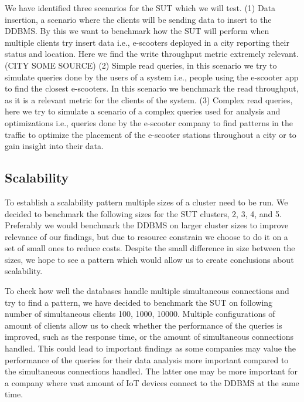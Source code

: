 We have identified three scenarios for the SUT which we will test.
(1) Data insertion, a scenario where the clients will be sending data to insert to the DDBMS.
By this we want to benchmark how the SUT will perform when multiple clients try insert data i.e., e-scooters deployed in a city reporting their status and location.
Here we find the write throughput metric extremely relevant. (CITY SOME SOURCE)
(2) Simple read queries, in this scenario we try to simulate queries done by the users of a system i.e., people using the e-scooter app to find the closest e-scooters.
In this scenario we benchmark the read throughput, as it is a relevant metric for the clients of the system.
(3) Complex read queries, here we try to simulate a scenario of a complex queries used for analysis and optimizations i.e., queries done by the e-scooter company to find patterns in the traffic to optimize the placement of the e-scooter stations throughout a city or to gain insight into their data.

\subsection{Scalability}
To establish a scalability pattern multiple sizes of a cluster need to be run.
We decided to benchmark the following sizes for the SUT clusters, 2, 3, 4, and 5.
Preferably we would benchmark the DDBMS on larger cluster sizes to improve relevance of our findings, but due to resource constrain we choose to do it on a set of small ones to reduce costs.
Despite the small difference in size between the sizes, we hope to see a pattern which would allow us to create conclusions about scalability.

To check how well the databases handle multiple simultaneous connections and try to find a pattern, we have decided to benchmark the SUT on following number of simultaneous clients 100, 1000, 10000.
Multiple configurations of amount of clients allow us to check whether the performance of the queries is improved, such as the response time, or the amount of simultaneous connections handled.
This could lead to important findings as some companies may value the performance of the queries for their data analysis more important compared to the simultaneous connections handled.
The latter one may be more important for a company where vast amount of IoT devices connect to the DDBMS at the same time.

